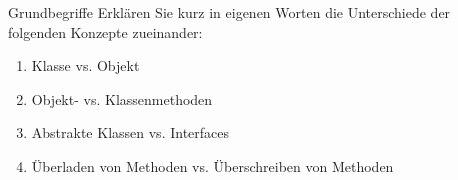 \documentclass{../tuda-exercise}
\begin{document}
  \maketitle

  \begin{task}[credit=\stars{0}{3}]{Grundbegriffe}
    Erklären Sie kurz in eigenen Worten die Unterschiede der folgenden Konzepte zueinander:

    \begin{enumerate}
      \item Klasse vs. Objekt
      \item Objekt- vs. Klassenmethoden
      \item Abstrakte Klassen vs. Interfaces
      \item Überladen von Methoden vs. Überschreiben von Methoden
    \end{enumerate}


\end{task}
\end{document}
